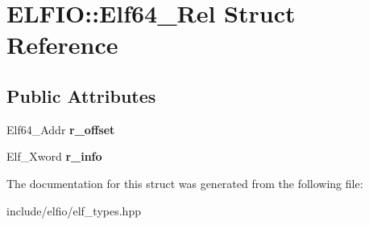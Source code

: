 \hypertarget{struct_e_l_f_i_o_1_1_elf64___rel}{}\section{E\+L\+F\+IO\+:\+:Elf64\+\_\+\+Rel Struct Reference}
\label{struct_e_l_f_i_o_1_1_elf64___rel}
\subsection*{Public Attributes}
\begin{DoxyCompactItemize}
\item 
Elf64\+\_\+\+Addr {\bfseries r\+\_\+offset}\hypertarget{struct_e_l_f_i_o_1_1_elf64___rel_a7b23a4a4201b8639ce4e9c610488e2ff}{}\label{struct_e_l_f_i_o_1_1_elf64___rel_a7b23a4a4201b8639ce4e9c610488e2ff}

\item 
Elf\+\_\+\+Xword {\bfseries r\+\_\+info}\hypertarget{struct_e_l_f_i_o_1_1_elf64___rel_aca11654ff3c8dbc5e17adae7edf0548f}{}\label{struct_e_l_f_i_o_1_1_elf64___rel_aca11654ff3c8dbc5e17adae7edf0548f}

\end{DoxyCompactItemize}


The documentation for this struct was generated from the following file\+:\begin{DoxyCompactItemize}
\item 
include/elfio/elf\+\_\+types.\+hpp\end{DoxyCompactItemize}
